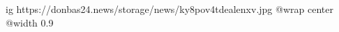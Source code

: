  
 
 
 
 

\ifcmt
  ig https://donbas24.news/storage/news/ky8pov4tdealenxv.jpg
  @wrap center
  @width 0.9
\fi
